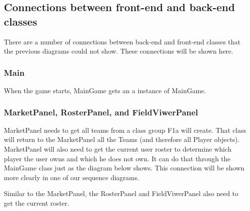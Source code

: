 \documentclass{article}
\begin{document}
\newpage
\subsection{Connections between front-end and back-end classes}
There are a number of connections between back-end and front-end classes that the previous diagrams could not show. These connections will be shown here.
\subsubsection{Main}
When the game starts, MainGame gets an a instance of MainGame.


\subsubsection{MarketPanel, RosterPanel, and FieldViwerPanel}
MarketPanel needs to get all teams from a class group F1a will create. That class will return to the MarketPanel all the Teams (and therefore all Player objects). MarketPanel will also need to get the current user roster to determine which player the user owns and which he does not own. It can do that through the MainGame class just as the diagram below shows. This connection will be shown more clearly in one of our sequence diagrams.

Similar to the MarketPanel, the RosterPanel and FieldViwerPanel also need to get the current roster.
\end{document}
